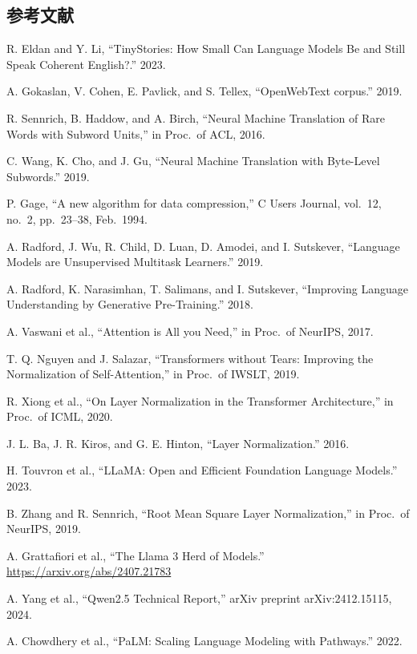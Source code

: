 \subsection*{参考文献}
\begingroup
\small
\begin{enumerate}[label={[\arabic*]}, leftmargin=*, itemsep=1.5pt]
  \item R. Eldan and Y. Li, ``TinyStories: How Small Can Language Models Be and Still Speak Coherent English?.'' 2023.
  \item A. Gokaslan, V. Cohen, E. Pavlick, and S. Tellex, ``OpenWebText corpus.'' 2019.
  \item R. Sennrich, B. Haddow, and A. Birch, ``Neural Machine Translation of Rare Words with Subword Units,'' in Proc.\ of ACL, 2016.
  \item C. Wang, K. Cho, and J. Gu, ``Neural Machine Translation with Byte-Level Subwords.'' 2019.
  \item P. Gage, ``A new algorithm for data compression,'' C Users Journal, vol.\ 12, no.\ 2, pp.\ 23--38, Feb.\ 1994.
  \item A. Radford, J. Wu, R. Child, D. Luan, D. Amodei, and I. Sutskever, ``Language Models are Unsupervised Multitask Learners.'' 2019.
  \item A. Radford, K. Narasimhan, T. Salimans, and I. Sutskever, ``Improving Language Understanding by Generative Pre-Training.'' 2018.
  \item A. Vaswani et al., ``Attention is All you Need,'' in Proc.\ of NeurIPS, 2017.
  \item T. Q. Nguyen and J. Salazar, ``Transformers without Tears: Improving the Normalization of Self-Attention,'' in Proc.\ of IWSLT, 2019.
  \item R. Xiong et al., ``On Layer Normalization in the Transformer Architecture,'' in Proc.\ of ICML, 2020.
  \item J. L. Ba, J. R. Kiros, and G. E. Hinton, ``Layer Normalization.'' 2016.
  \item H. Touvron et al., ``LLaMA: Open and Efficient Foundation Language Models.'' 2023.
  \item B. Zhang and R. Sennrich, ``Root Mean Square Layer Normalization,'' in Proc.\ of NeurIPS, 2019.
  \item A. Grattafiori et al., ``The Llama 3 Herd of Models.'' \url{https://arxiv.org/abs/2407.21783}
  \item A. Yang et al., ``Qwen2.5 Technical Report,'' arXiv preprint arXiv:2412.15115, 2024.
  \item A. Chowdhery et al., ``PaLM: Scaling Language Modeling with Pathways.'' 2022.

\end{enumerate}
